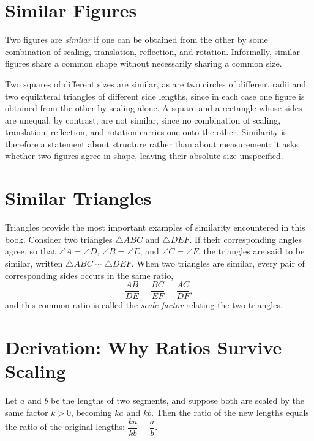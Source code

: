 \section{Similar Figures}

\begin{definition}
Two figures are \emph{similar} if one can be obtained from the other by some
combination of scaling, translation, reflection, and rotation. Informally,
similar figures share a common shape without necessarily sharing a common
size.
\end{definition}

Two squares of different sizes are similar, as are two circles of different
radii and two equilateral triangles of different side lengths, since in each
case one figure is obtained from the other by scaling alone. A square and a
rectangle whose sides are unequal, by contrast, are not similar, since no
combination of scaling, translation, reflection, and rotation carries one
onto the other. Similarity is therefore a statement about structure rather
than about measurement: it asks whether two figures agree in shape, leaving
their absolute size unspecified.

\section{Similar Triangles}

Triangles provide the most important examples of similarity encountered in
this book. Consider two triangles $\triangle ABC$ and $\triangle DEF$. If
their corresponding angles agree, so that $\angle A = \angle D$,
$\angle B = \angle E$, and $\angle C = \angle F$, the triangles are said to be
similar, written $\triangle ABC \sim \triangle DEF$. When two triangles are
similar, every pair of corresponding sides occurs in the same ratio,
\[
\frac{AB}{DE} = \frac{BC}{EF} = \frac{AC}{DF},
\]
and this common ratio is called the \emph{scale factor} relating the two
triangles.

\section{Derivation: Why Ratios Survive Scaling}

\begin{theorem}
Let $a$ and $b$ be the lengths of two segments, and suppose both are scaled
by the same factor $k > 0$, becoming $ka$ and $kb$. Then the ratio of the new
lengths equals the ratio of the original lengths: $\dfrac{ka}{kb} =
\dfrac{a}{b}$.
\end{theorem}

